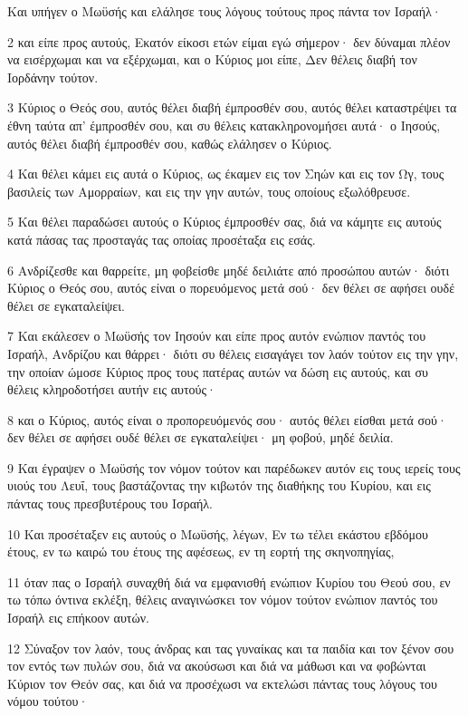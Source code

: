 \par Και υπήγεν ο Μωϋσής και ελάλησε τους λόγους τούτους προς πάντα τον Ισραήλ·
\par 2 και είπε προς αυτούς, Εκατόν είκοσι ετών είμαι εγώ σήμερον· δεν δύναμαι πλέον να εισέρχωμαι και να εξέρχωμαι, και ο Κύριος μοι είπε, Δεν θέλεις διαβή τον Ιορδάνην τούτον.
\par 3 Κύριος ο Θεός σου, αυτός θέλει διαβή έμπροσθέν σου, αυτός θέλει καταστρέψει τα έθνη ταύτα απ' έμπροσθέν σου, και συ θέλεις κατακληρονομήσει αυτά· ο Ιησούς, αυτός θέλει διαβή έμπροσθέν σου, καθώς ελάλησεν ο Κύριος.
\par 4 Και θέλει κάμει εις αυτά ο Κύριος, ως έκαμεν εις τον Σηών και εις τον Ωγ, τους βασιλείς των Αμορραίων, και εις την γην αυτών, τους οποίους εξωλόθρευσε.
\par 5 Και θέλει παραδώσει αυτούς ο Κύριος έμπροσθέν σας, διά να κάμητε εις αυτούς κατά πάσας τας προσταγάς τας οποίας προσέταξα εις εσάς.
\par 6 Ανδρίζεσθε και θαρρείτε, μη φοβείσθε μηδέ δειλιάτε από προσώπου αυτών· διότι Κύριος ο Θεός σου, αυτός είναι ο πορευόμενος μετά σού· δεν θέλει σε αφήσει ουδέ θέλει σε εγκαταλείψει.
\par 7 Και εκάλεσεν ο Μωϋσής τον Ιησούν και είπε προς αυτόν ενώπιον παντός του Ισραήλ, Ανδρίζου και θάρρει· διότι συ θέλεις εισαγάγει τον λαόν τούτον εις την γην, την οποίαν ώμοσε Κύριος προς τους πατέρας αυτών να δώση εις αυτούς, και συ θέλεις κληροδοτήσει αυτήν εις αυτούς·
\par 8 και ο Κύριος, αυτός είναι ο προπορευόμενός σου· αυτός θέλει είσθαι μετά σού· δεν θέλει σε αφήσει ουδέ θέλει σε εγκαταλείψει· μη φοβού, μηδέ δειλία.
\par 9 Και έγραψεν ο Μωϋσής τον νόμον τούτον και παρέδωκεν αυτόν εις τους ιερείς τους υιούς του Λευΐ, τους βαστάζοντας την κιβωτόν της διαθήκης του Κυρίου, και εις πάντας τους πρεσβυτέρους του Ισραήλ.
\par 10 Και προσέταξεν εις αυτούς ο Μωϋσής, λέγων, Εν τω τέλει εκάστου εβδόμου έτους, εν τω καιρώ του έτους της αφέσεως, εν τη εορτή της σκηνοπηγίας,
\par 11 όταν πας ο Ισραήλ συναχθή διά να εμφανισθή ενώπιον Κυρίου του Θεού σου, εν τω τόπω όντινα εκλέξη, θέλεις αναγινώσκει τον νόμον τούτον ενώπιον παντός του Ισραήλ εις επήκοον αυτών.
\par 12 Σύναξον τον λαόν, τους άνδρας και τας γυναίκας και τα παιδία και τον ξένον σου τον εντός των πυλών σου, διά να ακούσωσι και διά να μάθωσι και να φοβώνται Κύριον τον Θεόν σας, και διά να προσέχωσι να εκτελώσι πάντας τους λόγους του νόμου τούτου·
